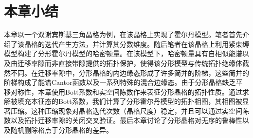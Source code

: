 \section{本章小结}
本章以一个双谢宾斯基三角晶格为例，在该晶格上实现了霍尔丹模型。笔者首先介绍了该晶格的迭代产生方法，并计算其分数维度。随后笔者在该晶格上利用紧束缚模型构建了分形霍尔丹模型的哈密顿量。在该模型下，哈密顿量具有自相似能谱以及由迁移率隙而非直接带隙提供的拓扑保护，使得该分形模型与传统拓扑绝缘体截然不同。在迁移率隙中，分形晶格的内边缘态形成了许多简并的阶梯，这些简并的阶梯构成了能谱Cantor函数以及一系列特殊的混合边缘态。由于分形晶格缺乏平移对称性，本章使用Bott系数和实空间陈数作来表征分形晶格的拓扑性质。通过求解被填充本征态的Bott系数，我们计算了分形霍尔丹模型的拓扑相图，其相图被显著压缩。这种压缩现象对晶格迭代次数（晶格尺度）稳定，并且可以通过实空间陈数以及拓扑迁移率隙的关闭交叉验证。最后本章讨论了分形晶格对无序的鲁棒性以及随机删除格点于分形晶格的差异。